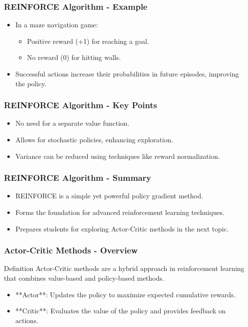 \documentclass[aspectratio=169]{beamer}
\begin{document}
\begin{frame}[fragile]
  \frametitle{REINFORCE Algorithm - Example}
  \begin{itemize}
    \item In a maze navigation game:
      \begin{itemize}
        \item Positive reward (+1) for reaching a goal.
        \item No reward (0) for hitting walls.
      \end{itemize}
    \item Successful actions increase their probabilities in future episodes, improving the policy.
  \end{itemize}
\end{frame}

\begin{frame}[fragile]
  \frametitle{REINFORCE Algorithm - Key Points}
  \begin{itemize}
    \item No need for a separate value function.
    \item Allows for stochastic policies, enhancing exploration.
    \item Variance can be reduced using techniques like reward normalization.
  \end{itemize}
\end{frame}

\begin{frame}[fragile]
  \frametitle{REINFORCE Algorithm - Summary}
  \begin{itemize}
    \item REINFORCE is a simple yet powerful policy gradient method.
    \item Forms the foundation for advanced reinforcement learning techniques.
    \item Prepares students for exploring Actor-Critic methods in the next topic.
  \end{itemize}
\end{frame}

\begin{frame}[fragile]
    \frametitle{Actor-Critic Methods - Overview}
    \begin{block}{Definition}
        Actor-Critic methods are a hybrid approach in reinforcement learning that combines value-based and policy-based methods.
    \end{block}
    \begin{itemize}
        \item **Actor**: Updates the policy to maximize expected cumulative rewards.
        \item **Critic**: Evaluates the value of the policy and provides feedback on actions.
    \end{itemize}
\end{frame}
\end{document}
